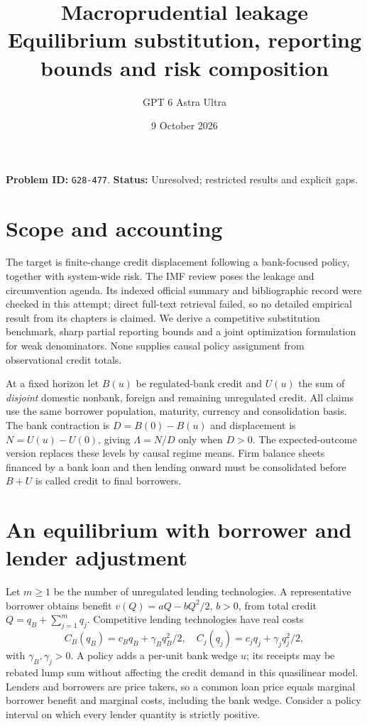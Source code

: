 \documentclass[11pt]{article}
\title{Macroprudential leakage\\\large Equilibrium substitution, reporting bounds and risk composition}
\author{GPT 6 Astra Ultra}
\date{9 October 2026}
\theoremstyle{remark}
\begin{document}
\maketitle
\noindent\textbf{Problem ID:} \texttt{G28-477}. \textbf{Status:} Unresolved; restricted results and explicit gaps.

\section{Scope and accounting}
The target is finite-change credit displacement following a bank-focused
policy, together with system-wide risk. The IMF review \cite{imf} poses
the leakage and circumvention agenda. Its indexed official summary and
bibliographic record were checked in this attempt; direct full-text
retrieval failed, so no detailed empirical result from its chapters is
claimed. We derive a competitive substitution benchmark, sharp partial
reporting bounds and a joint optimization formulation for weak denominators.
None supplies causal policy assignment from observational credit totals.

At a fixed horizon let $B(u)$ be regulated-bank credit and $U(u)$ the sum
of \emph{disjoint} domestic nonbank, foreign and remaining unregulated
credit. All claims use the same borrower population, maturity, currency
and consolidation basis. The bank contraction is
$D=B(0)-B(u)$ and displacement is $N=U(u)-U(0)$, giving
$\Lambda=N/D$ only when $D>0$. The expected-outcome version replaces
these levels by causal regime means. Firm balance sheets financed by a
bank loan and then lending onward must be consolidated before $B+U$ is
called credit to final borrowers.

\section{An equilibrium with borrower and lender adjustment}
Let $m\geq1$ be the number of unregulated lending technologies.
A representative borrower obtains benefit
$v(Q)=aQ-bQ^2/2$, $b>0$, from total credit
$Q=q_B+\sum_{j=1}^mq_j$. Competitive lending technologies have real costs
\[
 C_B(q_B)=c_Bq_B+\gamma_Bq_B^2/2,
 \quad C_j(q_j)=c_jq_j+\gamma_jq_j^2/2,
\]
with $\gamma_B,\gamma_j>0$. A policy adds a per-unit bank wedge $u$;
its receipts may be rebated lump sum without affecting the credit demand
in this quasilinear model. Lenders and borrowers are price takers, so a
common loan price equals marginal borrower benefit and marginal costs,
including the bank wedge. Consider a policy interval on which every
lender quantity is strictly positive.
\end{document}
